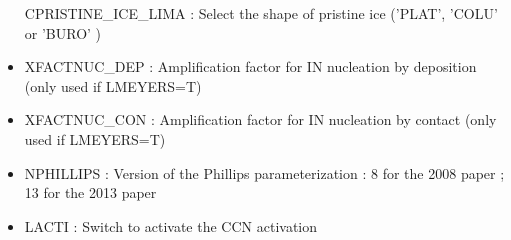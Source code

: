 \begin{itemize}
CPRISTINE\_ICE\_LIMA : Select the shape of pristine ice ('PLAT', 'COLU' or 'BURO' )
\item
{}
XFACTNUC\_DEP : Amplification factor for IN nucleation by deposition (only used if LMEYERS=T)
\item
{}
XFACTNUC\_CON : Amplification factor for IN  nucleation by contact (only used if LMEYERS=T)
\item
{}
NPHILLIPS : Version of the Phillips parameterization : 8 for the 2008 paper ; 13 for the 2013 paper
\item
{}
LACTI : Switch to activate the CCN activation 


\end{itemize}
